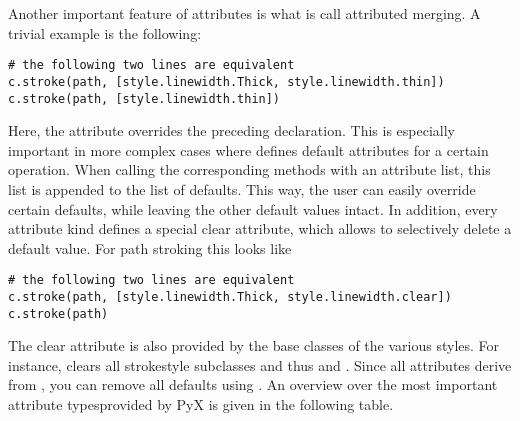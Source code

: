 Another important feature of \PyX{} attributes is what is call attributed
merging. A trivial example is the following:
\begin{verbatim}
# the following two lines are equivalent
c.stroke(path, [style.linewidth.Thick, style.linewidth.thin])
c.stroke(path, [style.linewidth.thin])
\end{verbatim}
Here, the  attribute overrides the preceding
 declaration. This is especially important
in more complex cases where \PyX defines default attributes for a
certain operation. When calling the corresponding methods with an
attribute list, this list is appended to the list of defaults.
This way, the user can easily override certain defaults, while leaving
the other default values intact. In addition, every attribute kind
defines a special clear attribute, which allows to selectively delete
a default value. For path stroking this looks like
\begin{verbatim}
# the following two lines are equivalent
c.stroke(path, [style.linewidth.Thick, style.linewidth.clear])
c.stroke(path)
\end{verbatim}
The clear attribute is also provided by the base classes of 
the various styles. For instance, 
clears all strokestyle subclasses and thus  and
. Since all attributes derive from
, you can remove all defaults using
. An overview over the most important attribute typesprovided 
by PyX is given in the following table.
\medskip
